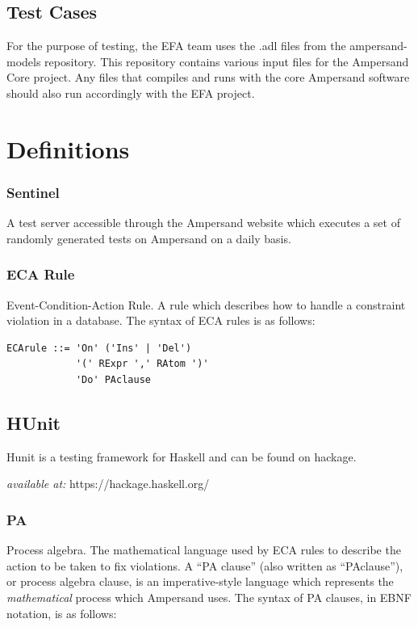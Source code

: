 \documentclass[12pt, svgnames]{article}
\begin{document}
\subsection{Test Cases}
For the purpose of testing, the EFA team uses the .adl files from the ampersand-models repository. This repository contains various input files for the Ampersand Core project. Any files that compiles and runs with the core Ampersand software should also run accordingly with the EFA project.

\section{Definitions}\label{sec:Abbrev}

 \subsubsection*{Sentinel}
A test server accessible through the Ampersand website which executes a set of 
randomly generated tests on Ampersand on a daily basis.

\subsubsection*{ECA Rule}
 Event-Condition-Action Rule. A rule which describes how to handle a constraint
 violation in a database. The syntax of ECA rules is as follows:
 

\begin{lstlisting}[basicstyle=\ttfamily]
ECArule ::= 'On' ('Ins' | 'Del') 
            '(' RExpr ',' RAtom ')'
            'Do' PAclause    
\end{lstlisting}

\subsection*{HUnit}
Hunit is a testing framework for Haskell and can be found on hackage.

\textit{available at:} https://hackage.haskell.org/

\subsubsection*{PA}
Process algebra. The mathematical language used by ECA rules to describe the
action to be taken to fix violations. A ``PA clause'' (also written as
``PAclause''), or process algebra clause, is an imperative-style language which
represents the \emph{mathematical} process which Ampersand uses. The syntax of
PA clauses, in EBNF notation, is as follows: 
\end{document}
